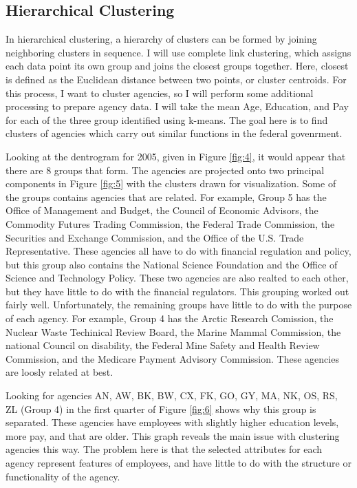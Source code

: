 \documentclass{article}
\begin{document}
    \subsection{Hierarchical Clustering}
    In hierarchical clustering, a hierarchy of clusters can be formed by joining neighboring clusters in sequence. I will use complete link clustering, which assigns each data point its own group and joins the closest groups together. Here, closest is defined as the Euclidean distance between two points, or cluster centroids. For this process, I want to cluster agencies, so I will perform some additional processing to prepare agency data. I will take the mean Age, Education, and Pay for each of the three group identified using k-means. The goal here is to find clusters of agencies which carry out similar functions in the federal govenrment.
    \par
    Looking at the dentrogram for 2005, given in Figure \ref{fig:4}, it would appear that there are 8 groups that form. The agencies are projected onto two principal components in Figure \ref{fig:5} with the clusters drawn for visualization. Some of the groups contains agencies that are related. For example, Group 5 has the Office of Management and Budget, the Council of Economic Advisors, the Commodity Futures Trading Commission, the Federal Trade Commission, the Securities and Exchange Commission, and the Office of the U.S. Trade Representative. These agencies all have to do with financial regulation and policy, but this group also contains the National Science Foundation and the Office of Science and Technology Policy. These two agencies are also realted to each other, but they have little to do with the financial regulators. This grouping worked out fairly well. Unfortunately, the remaining groups have little to do with the purpose of each agency. For example, Group 4 has the Arctic Research Comission, the Nuclear Waste Techinical Review Board, the Marine Mammal Commission, the national Council on disability, the Federal Mine Safety and Health Review Commission, and the Medicare Payment Advisory Commission. These agencies are loosly related at best.
    \par
    Looking for agencies AN, AW, BK, BW, CX, FK, GO, GY, MA, NK, OS, RS, ZL (Group 4) in the first quarter of Figure \ref{fig:6} shows why this group is separated. These agencies have employees with slightly higher education levels, more pay, and that are older. This graph reveals the main issue with clustering agencies this way. The problem here is that the selected attributes for each agency represent features of employees, and have little to do with the structure or functionality of the agency.
\end{document}
